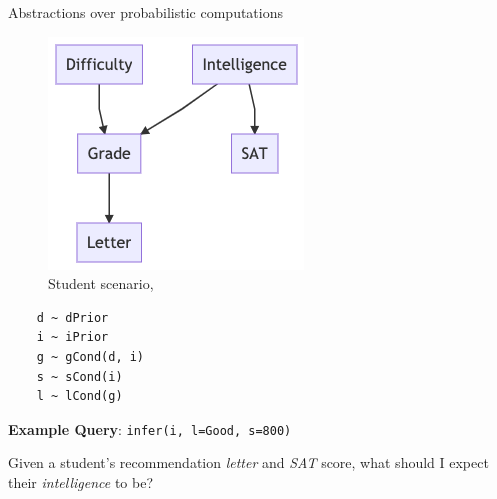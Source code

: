 \documentclass{beamer}
\begin{document}
\begin{frame}[fragile]{Abstractions over probabilistic computations}
\begin{minipage}{0.4\linewidth}
    \begin{figure}
        \centering
        \includegraphics[width=\linewidth]{figures/student-network.png}
        \caption{Student scenario, \cite{koller2009probabilistic}}
    \end{figure}
\end{minipage}
\begin{minipage}{0.58\linewidth}
    \begin{verbatim}
    d ~ dPrior
    i ~ iPrior
    g ~ gCond(d, i)
    s ~ sCond(i)
    l ~ lCond(g)
    \end{verbatim}
\end{minipage}

\textbf{Example Query}: \texttt{infer(i, {l=Good, s=800})}

Given a student's recommendation \emph{letter} and \emph{SAT} score,
what should I expect their \emph{intelligence} to be?


\end{frame}
\end{document}
